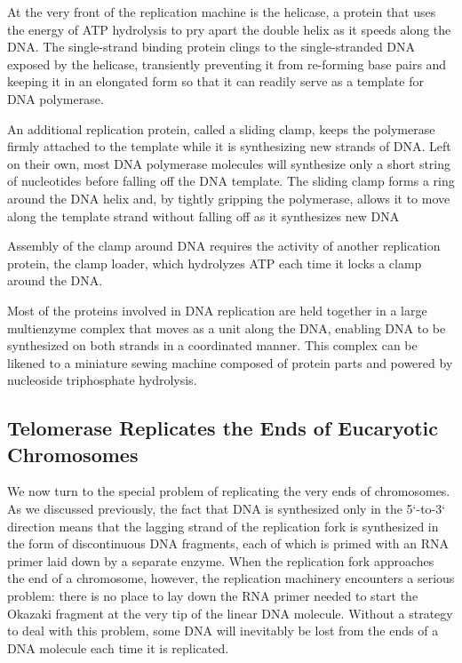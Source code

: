 At the very front of the replication
machine is the helicase, a protein that uses the energy of ATP hydrolysis
to pry apart the double helix as it speeds along the DNA.
The single-strand binding protein clings to the single-stranded
DNA exposed by the helicase, transiently preventing it from re-forming
base pairs and keeping it in an elongated form so that it can readily serve
as a template for DNA polymerase.

An additional replication protein, called a sliding clamp, keeps the
polymerase firmly attached to the template while it is synthesizing new
strands of DNA. Left on their own, most DNA polymerase molecules will
synthesize only a short string of nucleotides before falling off the DNA
template. The sliding clamp forms a ring around the DNA helix and, by
tightly gripping the polymerase, allows it to move along the template
strand without falling off as it synthesizes new DNA

Assembly of the clamp around DNA requires the activity of another
replication protein, the clamp loader, which hydrolyzes
ATP each time it locks a clamp around the DNA.

Most of the proteins involved in DNA replication are held together in a
large multienzyme complex that moves as a unit along the DNA, enabling
DNA to be synthesized on both strands in a coordinated manner.
This complex can be likened to a miniature sewing machine composed of
protein parts and powered by nucleoside triphosphate hydrolysis.

\subsection{Telomerase Replicates the Ends of Eucaryotic Chromosomes}

We now turn to the special problem of replicating the very ends of chromosomes. As we discussed previously,
the fact that DNA is synthesized only in the 5`-to-3` direction means that
the lagging strand of the replication fork is synthesized in the form of discontinuous
DNA fragments, each of which is primed with an RNA primer laid down by a separate enzyme.
When the replication fork approaches the end of a chromosome, however, the replication
machinery encounters a serious problem: there is no place to lay down
the RNA primer needed to start the Okazaki fragment at the very tip of
the linear DNA molecule. Without a strategy to deal with this problem,
some DNA will inevitably be lost from the ends of a DNA molecule each
time it is replicated.

